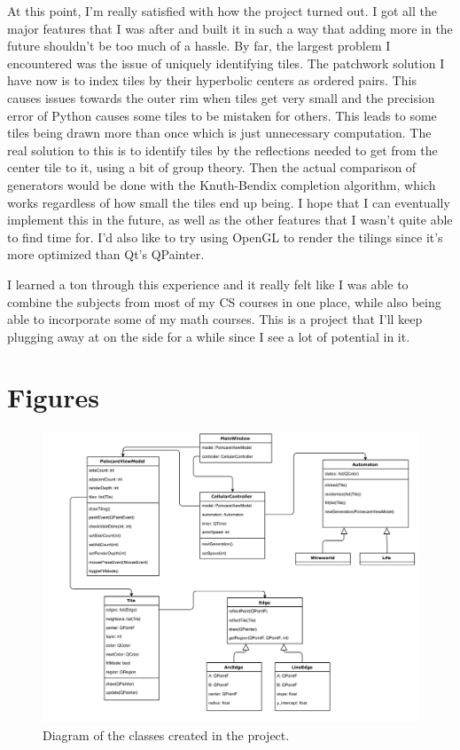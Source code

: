 \documentclass[letterpaper,12pt]{article}
\begin{document}
At this point, I'm really satisfied with how the project turned out. I got all the major features that I was after and built it in such a way that adding more in the future shouldn't be too much of a hassle. By far, the largest problem I encountered was the issue of uniquely identifying tiles. The patchwork solution I have now is to index tiles by their hyperbolic centers as ordered pairs. This causes issues towards the outer rim when tiles get very small and the precision error of Python causes some tiles to be mistaken for others. This leads to some tiles being drawn more than once which is just unnecessary computation. The real solution to this is to identify tiles by the reflections needed to get from the center tile to it, using a bit of group theory. Then the actual comparison of generators would be done with the Knuth-Bendix completion algorithm, which works regardless of how small the tiles end up being. I hope that I can eventually implement this in the future, as well as the other features that I wasn't quite able to find time for. I'd also like to try using OpenGL to render the tilings since it's more optimized than Qt's QPainter. 

I learned a ton through this experience and it really felt like I was able to combine the subjects from most of my CS courses in one place, while also being able to incorporate some of my math courses. This is a project that I'll keep plugging away at on the side for a while since I see a lot of potential in it.\\

\section*{Figures}
\begin{figure}[H]
\hspace{-10em}\includegraphics[width=\paperwidth]{../class_diagram.png}
\caption{Diagram of the classes created in the project.}
\centering
\end{figure}
\end{document}
